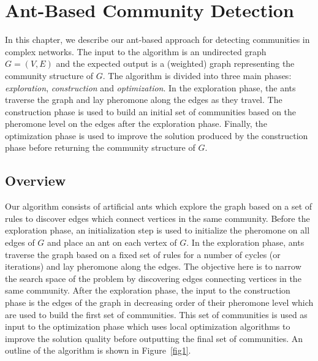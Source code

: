 \chapter{Ant-Based Community Detection}\label{abcd}
\pagestyle{myheadings}
\begin{spacing}{1.5}
In this chapter, we describe our ant-based approach for detecting communities in complex networks. The input to the algorithm is an undirected graph $G=(V, E)$ and the expected output is a (weighted) graph representing the community structure of $G$. The algorithm is divided into three main phases: \emph{exploration}, \emph{construction} and \emph{optimization}. In the exploration phase, the ants traverse the graph and lay pheromone along the edges as they travel. The construction phase is used to build an initial set of communities based on the pheromone level on the edges after the exploration phase. Finally, the optimization phase is used to improve the solution produced by the construction phase before returning the community structure of $G$.
\section{Overview}
Our algorithm consists of artificial ants which explore the graph based on a set of rules to discover edges which connect vertices in the same community. Before the exploration phase, an initialization step is used to initialize the pheromone on all edges of $G$ and place an ant on each vertex of $G$. In the exploration phase, ants traverse the graph based on a fixed set of rules for a number of cycles (or iterations) and lay pheromone along the edges. The objective here is to narrow the search space of the problem by discovering edges connecting vertices in the same community. After the exploration phase, the input to the construction phase is the edges of the graph in decreasing order of their pheromone level which are used to build the first set of communities. This set of communities is used as input to the optimization phase which uses local optimization algorithms to improve the solution quality before outputting the final set of communities. An outline of the algorithm is shown in Figure~\ref{fig1}.\\


\end{spacing}
